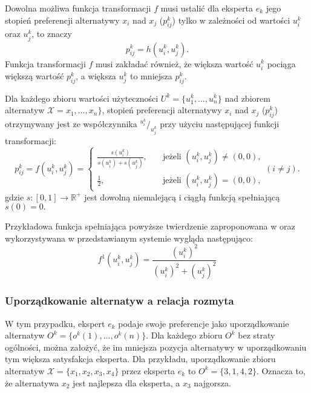 Dowolna możliwa funkcja transformacji $f$ musi ustalić dla eksperta $e_k$ jego
stopień preferencji alternatywy $x_i$ nad $x_j$ ($p^k_{ij}$) tylko w zależności
od wartości $u^k_i$ oraz $u^k_j$, to znaczy 
\begin{equation}
p^k_{ij} = h(u^k_i, u^k_j).
\end{equation}
Funkcja transformacji $f$ musi zakładać również, że większa wartość $u^k_i$
pociąga większą wartość $p^k_{ij}$, a większa $u^k_j$ to mniejsza $p^k_{ij}.$

\begin{theorem}
Dla każdego zbioru wartości użyteczności $U^k = \{ u^k_1, \dotsc, u^k_n \}$ nad
zbiorem alternatyw $\mathcal{X} = x_1, \dotsc, x_n\}$, stopień preferencji
alternatywy $x_i$ nad $x_j$ ($p^k_{ij}$) otrzymywany jest ze współczynnika
$^{u^k_i}/_{u^k_j}$ przy użyciu następującej funkcji transformacji:
\begin{equation}
p^k_{ij} = f(u^k_i, u^k_j) =
  \left\{ 
	\begin{array}{ll}
	  \frac{s(u^k_i)}{s(u^k_i) + s(u^k_j)} , & \quad \textrm{jeżeli } (u^k_i,u^k_j)
	  \neq (0,0) ,
	  \\
      \frac{1}{2} , & \quad \textrm{jeżeli } (u^k_i,u^k_j) = (0,0),
  	\end{array} 
  \right. (i \neq j) .
\end{equation}
gdzie $s : [0,1] \rightarrow \mathbb{R}^+$ jest dowolną niemalejącą i ciągłą
funkcją spełniającą $s(0) = 0.$
\end{theorem}

Przykładowa funkcja spełniająca powyższe twierdzenie zaproponowana w
\cite{Chiclana1996} oraz wykorzystywana w przedstawianym systemie wygląda
następująco:
\begin{equation}
f^1(u^k_i,u^k_j) = \frac{(u^k_i)^2}{(u^k_i)^2 + (u^k_j)^2}
\end{equation}

\subsubsection{Uporządkowanie alternatyw a relacja rozmyta}
W tym przypadku, ekspert $e_k$ podaje swoje preferencje jako uporządkowanie
alternatyw $O^k = \{o^k(1), \dotsc, o^k(n)\}$. Dla każdego zbioru $O^k$ bez
straty ogólności, można założyć, że im mniejsza pozycja alternatywy w
uporządkowaniu tym większa satysfakcja eksperta. Dla przykładu, uporządkowanie
zbioru alternatyw $\mathcal{X} = \{x_1,x_2,x_3,x_4\}$ przez eksperta $e_k$ to
$O^k = \{3,1,4,2\}.$ Oznacza to, że alternatywa $x_2$ jest najlepsza dla
eksperta, a $x_3$ najgorsza.

